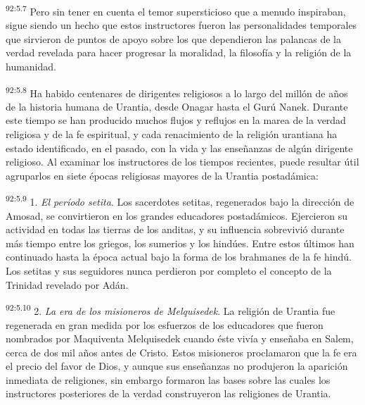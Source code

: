 \par
\textsuperscript{92:5.7} Pero sin tener en cuenta el temor supersticioso que a menudo inspiraban, sigue siendo un hecho que estos instructores fueron las personalidades temporales que sirvieron de puntos de apoyo sobre los que dependieron las palancas de la verdad revelada para hacer progresar la moralidad, la filosofía y la religión de la humanidad.

\par
\textsuperscript{92:5.8} Ha habido centenares de dirigentes religiosos a lo largo del millón de años de la historia humana de Urantia, desde Onagar hasta el Gurú Nanek. Durante este tiempo se han producido muchos flujos y reflujos en la marea de la verdad religiosa y de la fe espiritual, y cada renacimiento de la religión urantiana ha estado identificado, en el pasado, con la vida y las enseñanzas de algún dirigente religioso. Al examinar los instructores de los tiempos recientes, puede resultar útil agruparlos en siete épocas religiosas mayores de la Urantia postadámica:

\par
\textsuperscript{92:5.9} 1. \textit{El período setita}. Los sacerdotes setitas, regenerados bajo la dirección de Amosad, se convirtieron en los grandes educadores postadámicos. Ejercieron su actividad en todas las tierras de los anditas, y su influencia sobrevivió durante más tiempo entre los griegos, los sumerios y los hindúes. Entre estos últimos han continuado hasta la época actual bajo la forma de los brahmanes de la fe hindú. Los setitas y sus seguidores nunca perdieron por completo el concepto de la Trinidad revelado por Adán.

\par
\textsuperscript{92:5.10} 2. \textit{La era de los misioneros de Melquisedek}. La religión de Urantia fue regenerada en gran medida por los esfuerzos de los educadores que fueron nombrados por Maquiventa Melquisedek cuando éste vivía y enseñaba en Salem, cerca de dos mil años antes de Cristo. Estos misioneros proclamaron que la fe era el precio del favor de Dios, y aunque sus enseñanzas no produjeron la aparición inmediata de religiones, sin embargo formaron las bases sobre las cuales los instructores posteriores de la verdad construyeron las religiones de Urantia.

